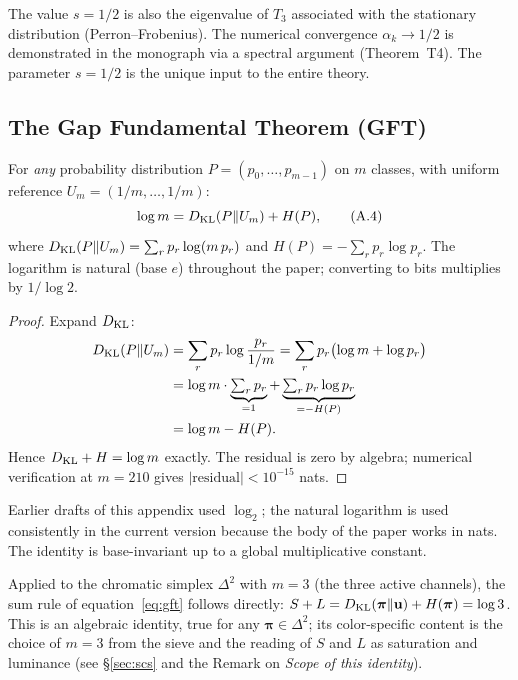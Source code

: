 \documentclass[12pt,a4paper]{article}
\begin{document}
\begin{remark}
The value $s = 1/2$ is also the eigenvalue of $T_3$ associated with
the stationary distribution (Perron--Frobenius). The numerical
convergence $\alpha_k \to 1/2$ is demonstrated in the monograph via a
spectral argument (Theorem~T4). The parameter $s = 1/2$ is the unique
input to the entire theory.
\end{remark}

\subsection{The Gap Fundamental Theorem (GFT)}
\label{app:gft}

\begin{identitybox}[Sum rule: $\DKL + H = \log m$]
For \emph{any} probability distribution
$P = (p_0, \ldots, p_{m-1})$ on $m$ classes, with uniform reference
$U_m = (1/m, \ldots, 1/m)$:
\begin{equation}
  \log m = D_{\mathrm{KL}}(P \| U_m) + H(P),
  \tag{A.4}
\end{equation}
where $D_{\mathrm{KL}}(P\|U_m) = \sum_r p_r \log(m\, p_r)$ and
$H(P) = -\sum_r p_r \log p_r$. The logarithm is natural (base $e$)
throughout the paper; converting to bits multiplies by $1/\log 2$.

\begin{proof}
Expand $D_{\mathrm{KL}}$:
\begin{align*}
  D_{\mathrm{KL}}(P\|U_m)
  &= \sum_r p_r \log\frac{p_r}{1/m}
   = \sum_r p_r \bigl(\log m + \log p_r\bigr) \\
  &= \log m \cdot \underbrace{\textstyle\sum_r p_r}_{=1}
   + \underbrace{\textstyle\sum_r p_r \log p_r}_{=-H(P)} \\
  &= \log m - H(P).
\end{align*}
Hence $\DKL + H = \log m$ exactly. The residual is zero by algebra;
numerical verification at $m = 210$ gives
$|\text{residual}| < 10^{-15}$ nats.
\end{proof}
\end{identitybox}

\begin{remark}
Earlier drafts of this appendix used $\log_2$; the natural logarithm
is used consistently in the current version because the body of the
paper works in nats. The identity is base-invariant up to a global
multiplicative constant.
\end{remark}

\begin{remark}
Applied to the chromatic simplex $\Delta^2$ with $m = 3$ (the three
active channels), the sum rule of equation~\eqref{eq:gft} follows
directly:
$S + L = D_{\mathrm{KL}}(\bm{\pi}\|\mathbf{u}) + H(\bm{\pi}) = \log 3$. This is
an algebraic identity, true for any $\bm{\pi} \in \Delta^2$; its
color-specific content is the choice of $m = 3$ from the sieve and
the reading of $S$ and $L$ as saturation and luminance (see
\S\ref{sec:scs} and the Remark on \emph{Scope of this identity}).
\end{remark}
\end{document}
